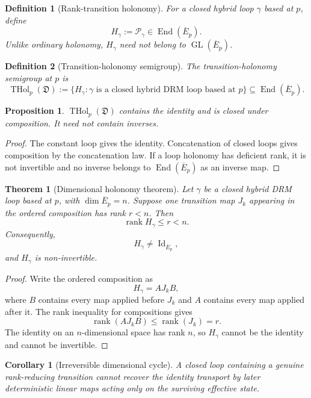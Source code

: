 \documentclass[11pt]{article}
\newtheorem{definition}{Definition}[section]
\newtheorem{theorem}{Theorem}[section]
\newtheorem{proposition}{Proposition}[section]
\newtheorem{corollary}{Corollary}[section]
\newcommand{\Id}{\operatorname{Id}}
\newcommand{\rank}{\operatorname{rank}}
\newcommand{\THol}{\operatorname{THol}}
\newcommand{\End}{\operatorname{End}}
\newcommand{\GL}{\operatorname{GL}}
\begin{document}
\begin{definition}[Rank-transition holonomy]
For a closed hybrid loop $\gamma$ based at $p$, define
\[
H_\gamma:=\mathcal P_\gamma\in\End(\overline E_p).
\]
Unlike ordinary holonomy, $H_\gamma$ need not belong to
$\GL(\overline E_p)$.
\end{definition}

\begin{definition}[Transition-holonomy semigroup]
The transition-holonomy semigroup at $p$ is
\[
\THol_p(\mathfrak D)
:=\{H_\gamma:\gamma\text{ is a closed hybrid DRM loop based at }p\}
\subseteq\End(\overline E_p).
\]
\end{definition}

\begin{proposition}
$\THol_p(\mathfrak D)$ contains the identity and is closed under composition.
It need not contain inverses.
\end{proposition}

\begin{proof}
The constant loop gives the identity. Concatenation of closed loops gives
composition by the concatenation law. If a loop holonomy has deficient rank,
it is not invertible and no inverse belongs to $\End(\overline E_p)$ as an
inverse map.
\end{proof}

\begin{theorem}[Dimensional holonomy theorem]
\label{thm:rank-holonomy}
Let $\gamma$ be a closed hybrid DRM loop based at $p$, with
$\dim\overline E_p=n$. Suppose one transition map $J_k$ appearing in the
ordered composition has rank $r<n$. Then
\[
\rank H_\gamma\le r<n.
\]
Consequently,
\[
H_\gamma\ne\Id_{\overline E_p},
\]
and $H_\gamma$ is non-invertible.
\end{theorem}

\begin{proof}
Write the ordered composition as
\[
H_\gamma=A J_k B,
\]
where $B$ contains every map applied before $J_k$ and $A$ contains every map
applied after it. The rank inequality for compositions gives
\[
\rank(AJ_kB)\le\rank(J_k)=r.
\]
The identity on an $n$-dimensional space has rank $n$, so $H_\gamma$ cannot be
the identity and cannot be invertible.
\end{proof}

\begin{corollary}[Irreversible dimensional cycle]
A closed loop containing a genuine rank-reducing transition cannot recover the
identity transport by later deterministic linear maps acting only on the
surviving effective state.
\end{corollary}
\end{document}
